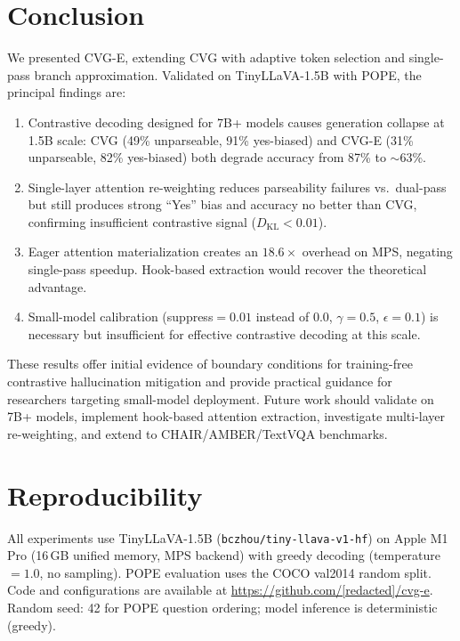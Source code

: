 \documentclass[10pt,twocolumn]{article}
\begin{document}
\section{Conclusion}

We presented CVG-E, extending CVG with adaptive token selection and single-pass branch approximation. Validated on TinyLLaVA-1.5B with POPE, the principal findings are:

\begin{enumerate}
\item Contrastive decoding designed for 7B+ models causes generation collapse at 1.5B scale: CVG (49\% unparseable, 91\% yes-biased) and CVG-E (31\% unparseable, 82\% yes-biased) both degrade accuracy from 87\% to $\sim$63\%.
\item Single-layer attention re-weighting reduces parseability failures vs.\ dual-pass but still produces strong ``Yes'' bias and accuracy no better than CVG, confirming insufficient contrastive signal ($D_{\text{KL}} < 0.01$).
\item Eager attention materialization creates an $18.6\times$ overhead on MPS, negating single-pass speedup. Hook-based extraction would recover the theoretical advantage.
\item Small-model calibration (suppress${}=0.01$ instead of 0.0, $\gamma{=}0.5$, $\epsilon{=}0.1$) is necessary but insufficient for effective contrastive decoding at this scale.
\end{enumerate}

These results offer initial evidence of boundary conditions for training-free contrastive hallucination mitigation and provide practical guidance for researchers targeting small-model deployment. Future work should validate on 7B+ models, implement hook-based attention extraction, investigate multi-layer re-weighting, and extend to CHAIR/AMBER/TextVQA benchmarks.

\section*{Reproducibility}
All experiments use TinyLLaVA-1.5B (\texttt{bczhou/tiny-llava-v1-hf}) on Apple M1 Pro (16\,GB unified memory, MPS backend) with greedy decoding (temperature${}=1.0$, no sampling). POPE evaluation uses the COCO val2014 random split. Code and configurations are available at \url{https://github.com/[redacted]/cvg-e}. Random seed: 42 for POPE question ordering; model inference is deterministic (greedy).
\end{document}

